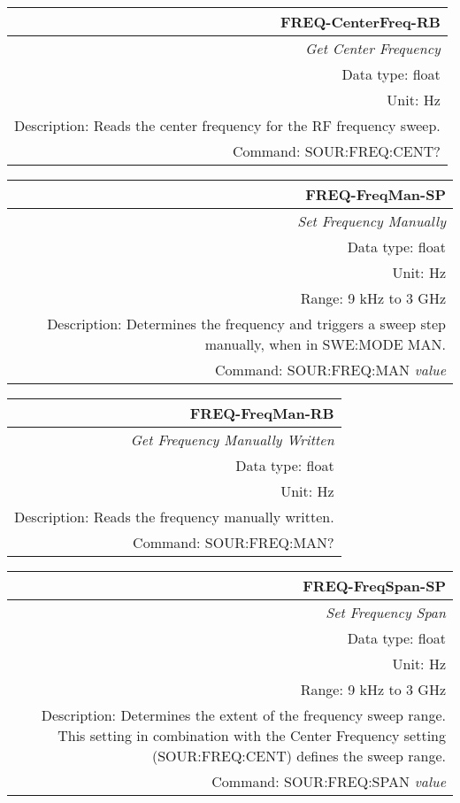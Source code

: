 \documentclass[openany]{article}
\begin{document}
		\begin{tabular}{N}
			\hline
			\bfseries FREQ-CenterFreq-RB \\ \hline
			\emph{Get Center Frequency} \\
			Data type: float \\
			Unit: Hz \\
			Description: Reads the center frequency for the RF frequency sweep. \\
			Command: SOUR:FREQ:CENT? \\

		\end{tabular}
%
		\begin{tabular}{N}
			\hline
			\bfseries FREQ-FreqMan-SP \\ \hline
			\emph{Set Frequency Manually} \\
			Data type: float \\
			Unit: Hz \\
			Range: 9 kHz to 3 GHz \\
			Description: Determines the frequency and triggers a sweep step manually, when in SWE:MODE MAN. \\
			Command: SOUR:FREQ:MAN \emph{value} \\
			
		\end{tabular}


		\begin{tabular}{N}
			\hline
			\bfseries FREQ-FreqMan-RB \\ \hline
			\emph{Get Frequency Manually Written} \\
			Data type: float \\
			Unit: Hz \\
			Description: Reads the frequency manually written. \\
			Command: SOUR:FREQ:MAN? \\

		\end{tabular}
%
		\begin{tabular}{N}
			\hline
			\bfseries FREQ-FreqSpan-SP \\ \hline
			\emph{Set Frequency Span} \\
			Data type: float \\
			Unit: Hz \\
			Range: 9 kHz to 3 GHz \\
			Description: Determines the extent of the frequency sweep range. This setting in combination with the Center Frequency setting (SOUR:FREQ:CENT) defines the sweep range. \\
			Command: SOUR:FREQ:SPAN \emph{value} \\
			
		\end{tabular}
\end{document}
